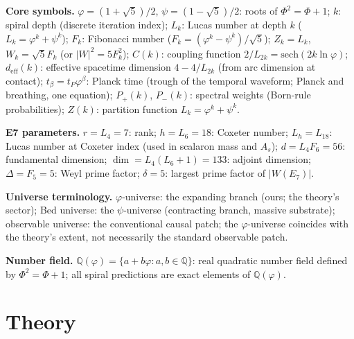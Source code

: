 \documentclass[12pt,a4paper]{article}
\newcommand{\bed}{Bed universe}
\begin{document}
\noindent \textbf{Core symbols.}
$\varphi = (1+\sqrt{5})/2$, $\psi = (1-\sqrt{5})/2$: roots of $\Phi^2 = \Phi + 1$; $k$: spiral depth (discrete iteration index); $L_k$: Lucas number at depth $k$ ($L_k = \varphi^k + \psi^k$); $F_k$: Fibonacci number ($F_k = (\varphi^k - \psi^k)/\sqrt{5}$); $Z_k = L_k$, $W_k = \sqrt{5}F_k$ (or $|W|^2 = 5F_k^2$); $C(k)$: coupling function $2/L_{2k} = \mathrm{sech}(2k\ln\varphi)$; $d_{\mathrm{eff}}(k)$: effective spacetime dimension $4 - 4/L_{2k}$ (from arc dimension at contact); $t_\beta = t_P \varphi^\beta$: Planck time (trough of the temporal waveform; Planck and breathing, one equation); $P_+(k)$, $P_-(k)$: spectral weights (Born-rule probabilities); $Z(k)$: partition function $L_k = \varphi^k + \psi^k$.

\medskip\noindent \textbf{E7 parameters.}
$r = L_4 = 7$: rank; $h = L_6 = 18$: Coxeter number; $L_h = L_{18}$: Lucas number at Coxeter index (used in scalaron mass and $A_s$); $d = L_4 F_6 = 56$: fundamental dimension; $\dim = L_4(L_6+1) = 133$: adjoint dimension; $\Delta = F_5 = 5$: Weyl prime factor; $\delta = 5$: largest prime factor of $|W(E_7)|$.

\medskip\noindent \textbf{Universe terminology.}
$\varphi$-universe: the expanding branch (ours; the theory's sector); \bed{}: the $\psi$-universe (contracting branch, massive substrate); observable universe: the conventional causal patch; the $\varphi$-universe coincides with the theory's extent, not necessarily the standard observable patch.

\medskip\noindent \textbf{Number field.}
$\mathbb{Q}(\varphi) = \{a + b\varphi : a, b \in \mathbb{Q}\}$: real quadratic number field defined by $\Phi^2 = \Phi + 1$; all spiral predictions are exact elements of $\mathbb{Q}(\varphi)$.

\newpage


\part{Theory}
\label{part:theory}
\label{part:trunk}

\end{document}
